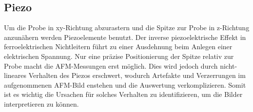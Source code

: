 \subsection{Piezo}
\label{sec:piezo}
    Um die Probe in xy-Richtung abzurastern und die Spitze zur Probe in z-Richtung anzunähern werden Piezoelemente benutzt.
    Der inverse piezoelektrische Effekt in ferroelektrischen Nichtleitern führt zu einer Ausdehnung beim Anlegen einer elektrischen Spannung.
    Nur eine präzise Positionierung der Spitze relativ zur Probe macht die AFM-Messungen erst möglich.
    Dies wird jedoch durch nicht-lineares Verhalten des Piezos erschwert, wodurch Artefakte und Verzerrungen im aufgenommenen AFM-Bild enstehen und die Auswertung verkomplizieren.
    Somit ist es wichtig die Ursachen für solches Verhalten zu identifizieren, um die Bilder interpretieren zu können.
    
